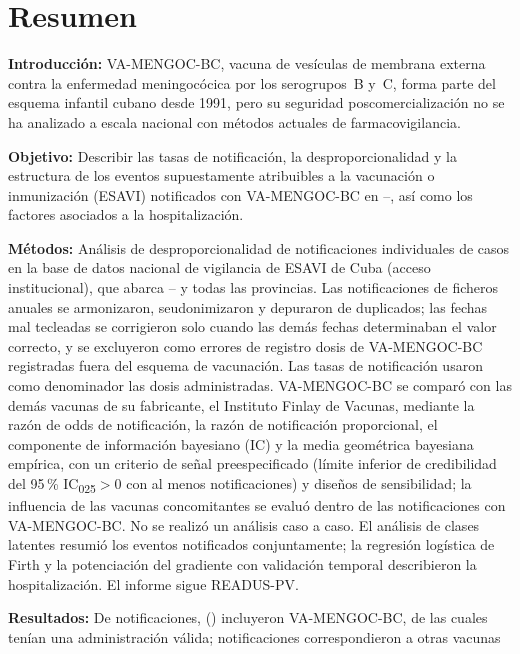\documentclass[11pt]{article}
\begin{document}
\section*{Resumen}
\noindent\textbf{Introducción:} VA-MENGOC-BC, vacuna de vesículas de membrana externa contra la
enfermedad meningocócica por los serogrupos~B y~C, forma parte del esquema infantil cubano desde
1991, pero su seguridad poscomercialización no se ha analizado a escala nacional con métodos
actuales de farmacovigilancia.\par
\noindent\textbf{Objetivo:} Describir las tasas de notificación, la desproporcionalidad y la
estructura de los eventos supuestamente atribuibles a la vacunación o inmunización (ESAVI)
notificados con VA-MENGOC-BC en \VStudyFirstYear--\VStudyLastYear, así como los factores asociados
a la hospitalización.\par
\noindent\textbf{Métodos:} Análisis de desproporcionalidad de notificaciones individuales de casos
en la base de datos nacional de vigilancia de ESAVI de Cuba (acceso institucional), que abarca
\VStudyFirstYear--\VStudyLastYear{} y todas las provincias. Las notificaciones de \VNFiles{}
ficheros anuales se armonizaron, seudonimizaron y depuraron de duplicados; las fechas mal tecleadas
se corrigieron solo cuando las demás fechas determinaban el valor correcto, y se excluyeron como
errores de registro \PONScheduleInvalid{} dosis de VA-MENGOC-BC registradas fuera del esquema de
vacunación. Las tasas de notificación usaron como denominador las dosis administradas. VA-MENGOC-BC
se comparó con las demás vacunas de su fabricante, el Instituto Finlay de Vacunas, mediante la
razón de odds de notificación, la razón de notificación proporcional, el
componente de información bayesiano (IC) y la media geométrica bayesiana empírica, con un criterio
de señal preespecificado (límite inferior de credibilidad del 95\,\% IC\textsubscript{025}${}>0$
con al menos \PODispMinReports{} notificaciones) y diseños de sensibilidad; la influencia de las
vacunas concomitantes se evaluó dentro de las notificaciones con VA-MENGOC-BC. No se realizó un
análisis caso a caso. El análisis de clases latentes resumió los eventos notificados
conjuntamente; la regresión logística de Firth y la potenciación del gradiente con validación
temporal describieron la hospitalización. El informe sigue READUS-PV.\par
\noindent\textbf{Resultados:} De \VReportsInWindow{} notificaciones, \PONTargetAll{}
(\POPctTargetAll) incluyeron VA-MENGOC-BC, de las cuales \PONTargetAnalysed{} tenían una
administración válida; \PONFinlayComparator{} notificaciones correspondieron a otras vacunas
\end{document}
